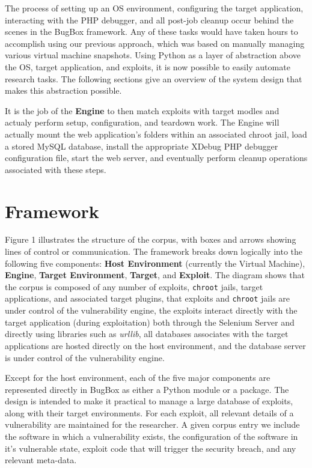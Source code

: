 \documentclass[letterpaper,twocolumn,10pt]{article}
\begin{document}
The process of setting up an OS environment, configuring the target application, interacting with the PHP debugger, and all post-job cleanup occur behind the scenes in the BugBox framework. Any of these tasks would have taken hours to accomplish using our previous approach, which was based on manually managing various virtual machine snapshots. Using Python as a layer of abstraction above the OS, target application, and exploits, it is now possible to easily automate research tasks. The following sections give an overview of the system design that makes this abstraction possible.

It is the job of the {\bf Engine} to then match exploits with target modles and actualy perform setup, configuration, and teardown work. The Engine will actually mount the web application's folders within an associated chroot jail, load a stored MySQL database, install the appropriate XDebug PHP debugger configuration file, start the web server, and eventually perform cleanup operations associated with these steps.

\section{Framework}

Figure 1 illustrates the structure of the corpus, with boxes and arrows showing lines of control or communication. The framework breaks down logically into the following five components: {\bf Host Environment} (currently the Virtual Machine), {\bf Engine}, {\bf Target Environment}, {\bf Target}, and {\bf Exploit}. The diagram shows that the corpus is composed of any number of exploits, {\tt chroot} jails, target applications, and associated target plugins, that exploits and {\tt chroot} jails are under control of the vulnerability engine, the exploits interact directly with the target application (during exploitation) both through the Selenium Server and directly using libraries such as \emph{urllib}, all databases associates with the target applications are hosted directly on the host environment, and the database server is under control of the vulnerability engine.\par
Except for the host environment, each of the five major components are represented directly in BugBox as either a Python module or a package. The design is intended to make it practical to manage a large database of exploits, along with their target environments. For each exploit, all relevant details of a vulnerability are maintained for the researcher. A given corpus entry we include the software in which a vulnerability exists, the configuration of the software in it's vulnerable state, exploit code that will trigger the security breach, and any relevant meta-data.\par
\end{document}
